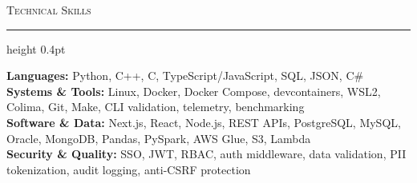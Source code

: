 \documentclass[letterpaper,11pt]{article}
\newcommand{\resumesection}[1]{%
  \par\vspace{2pt}%
  {\large\scshape #1}\par\vspace{2pt}%
  \hrule height 0.4pt\vspace{2pt}%
}
\begin{document}
\resumesection{Technical Skills}
\textbf{Languages:} Python, C++, C, TypeScript/JavaScript, SQL, JSON, C\#\\
\textbf{Systems \& Tools:} Linux, Docker, Docker Compose, devcontainers, WSL2, Colima, Git, Make, CLI validation, telemetry, benchmarking\\
\textbf{Software \& Data:} Next.js, React, Node.js, REST APIs, PostgreSQL, MySQL, Oracle, MongoDB, Pandas, PySpark, AWS Glue, S3, Lambda\\
\textbf{Security \& Quality:} SSO, JWT, RBAC, auth middleware, data validation, PII tokenization, audit logging, anti-CSRF protection
\end{document}
